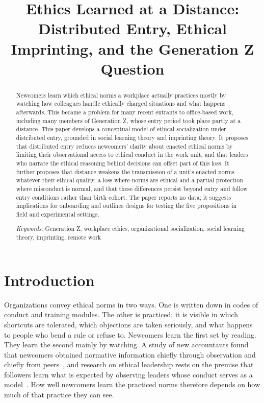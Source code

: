 \documentclass[12pt,a4paper]{article}
\title{Ethics Learned at a Distance: Distributed Entry, Ethical Imprinting, and the Generation Z Question}
\author{}
\date{}
\theoremstyle{definition}
\begin{document}
\maketitle
\vspace{-2em}

\begin{abstract}
\noindent Newcomers learn which ethical norms a workplace actually practices mostly by watching how colleagues handle ethically charged situations and what happens afterwards. This became a problem for many recent entrants to office-based work, including many members of Generation Z, whose entry period took place partly at a distance. This paper develops a conceptual model of ethical socialization under distributed entry, grounded in social learning theory and imprinting theory. It proposes that distributed entry reduces newcomers' clarity about enacted ethical norms by limiting their observational access to ethical conduct in the work unit, and that leaders who narrate the ethical reasoning behind decisions can offset part of this loss. It further proposes that distance weakens the transmission of a unit's enacted norms whatever their ethical quality, a loss where norms are ethical and a partial protection where misconduct is normal, and that these differences persist beyond entry and follow entry conditions rather than birth cohort. The paper reports no data; it suggests implications for onboarding and outlines designs for testing the five propositions in field and experimental settings.

\medskip
\noindent\textit{Keywords:} Generation Z, workplace ethics, organizational socialization, social learning theory, imprinting, remote work
\end{abstract}

\section{Introduction}
Organizations convey ethical norms in two ways. One is written down in codes of conduct and training modules. The other is practiced: it is visible in which shortcuts are tolerated, which objections are taken seriously, and what happens to people who bend a rule or refuse to. Newcomers learn the first set by reading. They learn the second mainly by watching. A study of new accountants found that newcomers obtained normative information chiefly through observation and chiefly from peers~\citep{morrison1993newcomer}, and research on ethical leadership rests on the premise that followers learn what is expected by observing leaders whose conduct serves as a model~\citep{brown2005ethical}. How well newcomers learn the practiced norms therefore depends on how much of that practice they can see.
\end{document}
